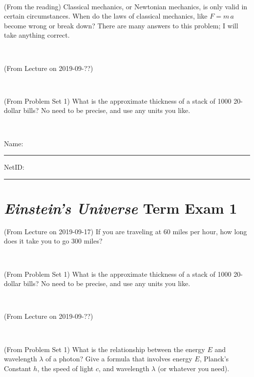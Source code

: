 \documentclass[12pt, letterpaper]{article}
\begin{document}
\vfill ~

\begin{problem} (From the reading)
Classical mechanics, or Newtonian mechanics, is only valid in certain
circumstances. When do the laws of classical mechanics, like $F =
m\,a$ become wrong or break down? There are many answers to this
problem; I will take anything correct.
\end{problem}


\vfill ~

\begin{problem} (From Lecture on 2019-09-??)
\end{problem}


\vfill ~

\begin{problem} (From Problem Set 1)
What is the approximate thickness of a stack of 1000 20-dollar bills?
No need to be precise, and use any units you like.
\end{problem}


\vfill ~


\cleardoublepage



\noindent
Name: \rule[-1ex]{0.60\textwidth}{0.1pt}
NetID: \rule[-1ex]{0.20\textwidth}{0.1pt}

\section*{\textsl{Einstein's Universe} Term Exam 1}
\setcounter{problem}{1}


\begin{problem} (From Lecture on 2019-09-17)
If you are traveling at 60 miles per hour, how long does
it take you to go 300 miles?
\end{problem}


\vfill ~

\begin{problem} (From Problem Set 1)
What is the approximate thickness of a stack of 1000 20-dollar bills?
No need to be precise, and use any units you like.
\end{problem}


\vfill ~

\begin{problem} (From Lecture on 2019-09-??)
\end{problem}


\vfill ~

\begin{problem} (From Problem Set 1)
What is the relationship between the energy $E$ and wavelength
$\lambda$ of a photon? Give a formula that involves energy $E$,
Planck's Constant $h$, the speed of light $c$, and wavelength
$\lambda$ (or whatever you need).
\end{problem}
\end{document}
